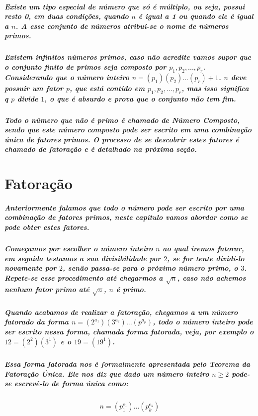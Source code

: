 \subparagraph{
Existe um tipo especial de n\'umero que s\'o \'e m\'ultiplo, ou seja, possui resto {0}, em duas condi\c{c}\~oes, quando $n$ \'e igual a {1} ou quando ele \'e igual a $n$. A esse conjunto de n\'umeros atribui-se o nome de \textit{n\'umeros primos}.
}
\subparagraph{
\textit{Existem infinitos n\'umeros primos}, caso n\~ao acredite vamos supor que o conjunto finito de primos seja composto por $p_{1},  p_{2}, ..., p_{r} $. Considerando que o n\'umero inteiro $n=(p_{1})(p_{2})...(p_{r}) + 1$. $n$ deve possuir um fator $p$, que est\'a contido em $p_{1},  p_{2}, ..., p_{r} $, mas isso significa q $p$ divide $1$, o que \'e absurdo e prova que o conjunto n\~ao tem fim.
}
\subparagraph{
Todo o n\'umero que n\~ao \'e primo \'e chamado de \textit{N\'umero Composto}, sendo que este n\'umero composto pode ser escrito em \textit {uma combina\c{c}\~ao \'unica de fatores primos}. O processo de se descobrir estes fatores \'e chamado de \textit{fatora\c{c}\~ao} e \'e detalhado na pr\'oxima se\c{c}\~ao.
}

\section{Fatora\c{c}\~{a}o}

\subparagraph{
Anteriormente falamos que todo o n\'umero pode ser escrito por uma combina\c{c}\~ao de fatores primos, neste cap\'itulo vamos abordar como se pode obter estes fatores.
}
\subparagraph{
Come\c{c}amos por escolher o n\'umero inteiro $n$ ao qual iremos fatorar, em seguida testamos a sua divisibilidade por $2$, se for tente divid\'i-lo novamente por $2$, sen\~ao passa-se para o pr\'oximo n\'umero primo, o $3$. Repete-se esse procedimento at\'e chegarmos a $\sqrt{n}$, caso n\~ao achemos nenhum fator primo at\'e $\sqrt{n}$, $n$ \'e primo.
}
\subparagraph{
Quando acabamos de realizar a fatora\c{c}\~ao, chegamos a um n\'umero fatorado da forma $n = (2^{a_{1}})(3^{a_{2}}) ... (p^{a_{p}})$, todo o n\'umero inteiro pode ser escrito nessa forma, chamada forma fatorada, veja, por exemplo o $12 = (2^2)(3^1)$ e o $19 = (19^1)$.
}
\subparagraph{
Essa forma fatorada nos \'e formalmente apresentada pelo \textit{Teorema da Fatora\c{c}\~ao \'Unica}. Ele nos diz que dado um n\'umero inteiro $n\geq2$ pode-se escrev\^e-lo de forma \'unica como:
}
\[	
	\begin{array}{c}
		\textit{$n = (p^{e_{1}}_{1}) ... (p^{e_{k}}_{k}) $}
	\end{array}
\]
